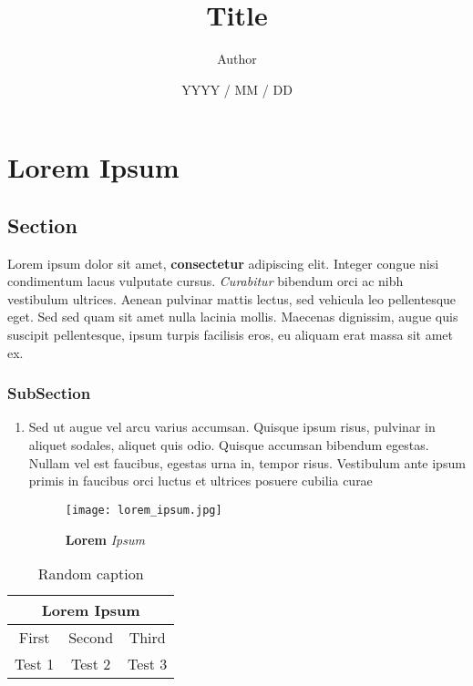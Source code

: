 \documentclass[12pt]{report}
\title{Title}
\author{Author}
\date{YYYY / MM / DD}
\begin{document}
	\maketitle
	\tableofcontents
	\chapter{Lorem Ipsum}

		\section{Section}

			Lorem ipsum dolor sit amet, \textbf{consectetur} adipiscing elit. Integer congue nisi condimentum lacus vulputate cursus. \textit{Curabitur} bibendum orci ac nibh vestibulum ultrices. Aenean pulvinar mattis lectus, sed vehicula leo pellentesque eget. Sed sed quam sit amet nulla lacinia mollis. Maecenas dignissim, augue quis suscipit pellentesque, ipsum turpis facilisis eros, eu aliquam erat massa sit amet ex.

			\subsection*{SubSection}

				\begin{enumerate}

					\item
					Sed ut augue vel arcu varius accumsan. Quisque ipsum risus, pulvinar in aliquet sodales, aliquet quis odio. Quisque accumsan bibendum egestas. Nullam vel est faucibus, egestas urna in, tempor risus. Vestibulum ante ipsum primis in faucibus orci luctus et ultrices posuere cubilia curae

					\begin{figure}[H]
						\centering
						\texttt{[image: lorem\_ipsum.jpg]}
						\caption{\textbf{Lorem} \textit{Ipsum}}
					\end{figure}

				\end{enumerate}

			\begin{table}[H]
				\centering
				\begin{tabular}{|c|c|c|}
					\hline
					\multicolumn{3}{|c|}{\textbf{Lorem Ipsum}} \\
					\hline
					First & Second & Third \\
					\hline
					Test 1 & Test 2 & Test 3 \\
					\hline
				\end{tabular}
				\caption{Random caption}
			\end{table}
\end{document}
